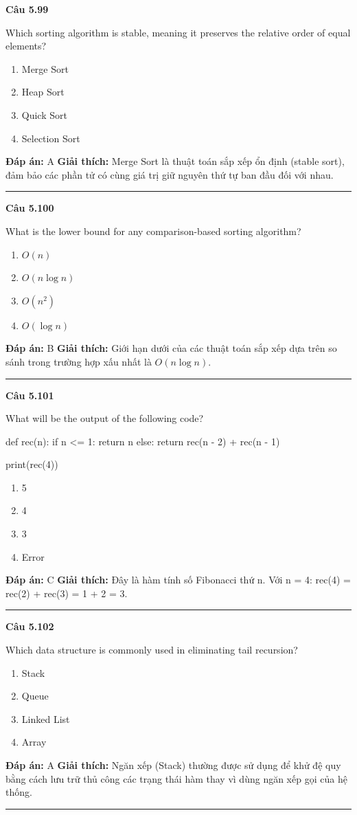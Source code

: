 \documentclass[11pt,a4paper]{article}
\newenvironment{question}[1]{%
  \par\vspace{1em}\noindent\textbf{\large Câu #1}\par\vspace{0.4em}
}{%
  \par\vspace{1em}\hrule\vspace{0.6em}
}
\newenvironment{choices}{%
  \begin{enumerate}[label=\textbf{\Alph*.},leftmargin=2.2em,itemsep=2pt,topsep=3pt]
}{%
  \end{enumerate}
}
\newcommand{\choice}{\item}
\newenvironment{codebox}{%
  \begin{tcolorbox}[colback=gray!8!white,colframe=gray!50!black,arc=1.5mm,boxrule=0.6pt,left=3mm,right=3mm,top=2.5mm,bottom=2.5mm]
  \ttfamily\small
}{%
  \end{tcolorbox}
}
\begin{document}
\begin{question}{5.99}
Which sorting algorithm is stable, meaning it preserves the relative order of equal elements?
\begin{choices}
\choice Merge Sort
\choice Heap Sort
\choice Quick Sort
\choice Selection Sort
\end{choices}
\textbf{Đáp án:} A
\textbf{Giải thích:} Merge Sort là thuật toán sắp xếp ổn định (stable sort), đảm bảo các phần tử có cùng giá trị giữ nguyên thứ tự ban đầu đối với nhau.
\end{question}

\begin{question}{5.100}
What is the lower bound for any comparison-based sorting algorithm?
\begin{choices}
\choice $O(n)$
\choice $O(n \log n)$
\choice $O(n^2)$
\choice $O(\log n)$
\end{choices}
\textbf{Đáp án:} B
\textbf{Giải thích:} Giới hạn dưới của các thuật toán sắp xếp dựa trên so sánh trong trường hợp xấu nhất là $O(n \log n)$.
\end{question}

\begin{question}{5.101}
What will be the output of the following code?
\begin{codebox}
def rec(n):
    if n <= 1:
        return n
    else:
        return rec(n - 2) + rec(n - 1)

print(rec(4))
\end{codebox}
\begin{choices}
\choice 5
\choice 4
\choice 3
\choice Error
\end{choices}
\textbf{Đáp án:} C
\textbf{Giải thích:} Đây là hàm tính số Fibonacci thứ n. Với n = 4: rec(4) = rec(2) + rec(3) = 1 + 2 = 3.
\end{question}

\begin{question}{5.102}
Which data structure is commonly used in eliminating tail recursion?
\begin{choices}
\choice Stack
\choice Queue
\choice Linked List
\choice Array
\end{choices}
\textbf{Đáp án:} A
\textbf{Giải thích:} Ngăn xếp (Stack) thường được sử dụng để khử đệ quy bằng cách lưu trữ thủ công các trạng thái hàm thay vì dùng ngăn xếp gọi của hệ thống.
\end{question}
\end{document}
